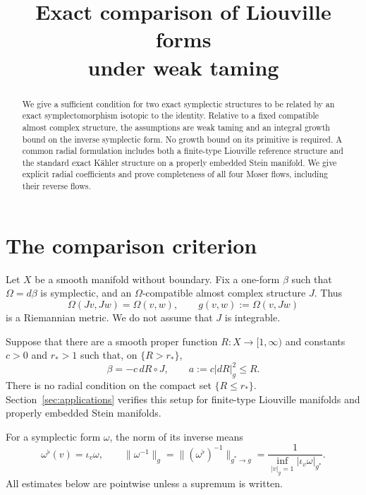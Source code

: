 \documentclass[11pt,a4paper]{article}
\title{\vspace{-12mm}Exact comparison of Liouville forms\protect\\ under weak taming}
\author{}
\date{}
\theoremstyle{remark}
\newcommand{\abs}[1]{\lvert #1\rvert}
\newcommand{\norm}[1]{\lVert #1\rVert}
\numberwithin{equation}{section}
\begin{document}
\maketitle
\vspace{-13mm}
\begin{abstract}
We give a sufficient condition for two exact symplectic structures to be related by an exact symplectomorphism isotopic to the identity. Relative to a fixed compatible almost complex structure, the assumptions are weak taming and an integral growth bound on the inverse symplectic form. No growth bound on its primitive is required. A common radial formulation includes both a finite-type Liouville reference structure and the standard exact K\"ahler structure on a properly embedded Stein manifold. We give explicit radial coefficients and prove completeness of all four Moser flows, including their reverse flows.
\end{abstract}

\section{The comparison criterion}

Let $X$ be a smooth manifold without boundary. Fix a one-form $\beta$ such that $\Omega=d\beta$ is symplectic, and an $\Omega$-compatible almost complex structure $J$. Thus
\[
\Omega(Jv,Jw)=\Omega(v,w),\qquad
g(v,w):=\Omega(v,Jw)
\]
is a Riemannian metric. We do not assume that $J$ is integrable.

Suppose that there are a smooth proper function $R:X\to[1,\infty)$ and constants $c>0$ and $r_*>1$ such that, on $\{R>r_*\}$,
\begin{equation}\label{eq:radialsetup}
\beta=-c\,dR\circ J,
\qquad a:=c\abs{dR}_g^2\le R.
\end{equation}
There is no radial condition on the compact set $\{R\le r_*\}$. Section~\ref{sec:applications} verifies this setup for finite-type Liouville manifolds and properly embedded Stein manifolds.

For a symplectic form $\omega$, the norm of its inverse means
\begin{equation}\label{eq:inversenorm}
\omega^\flat(v)=\iota_v\omega,\qquad
\norm{\omega^{-1}}_g
=\norm{(\omega^\flat)^{-1}}_{g^*\to g}
=\frac{1}{\displaystyle\inf_{\abs{v}_g=1}\abs{\iota_v\omega}_{g^*}}.
\end{equation}
All estimates below are pointwise unless a supremum is written.
\end{document}
